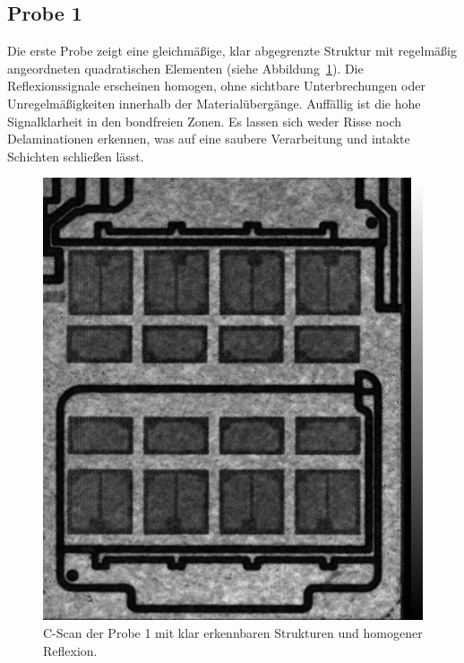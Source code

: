 \subsection{Probe 1}

Die erste Probe zeigt eine gleichmäßige, klar abgegrenzte Struktur mit regelmäßig angeordneten quadratischen Elementen (siehe Abbildung~\ref{Abbildung 6 :probe1}). Die Reflexionssignale erscheinen homogen, ohne sichtbare Unterbrechungen oder Unregelmäßigkeiten innerhalb der Materialübergänge. Auffällig ist die hohe Signalklarheit in den bondfreien Zonen. Es lassen sich weder Risse noch Delaminationen erkennen, was auf eine saubere Verarbeitung und intakte Schichten schließen lässt.
\vspace{0.2cm}
\begin{figure}[htbp]
    \centering
    \includegraphics[scale=0.20]{Bilder/Probe11.jpg}
    \caption{C-Scan der Probe 1 mit klar erkennbaren Strukturen und homogener Reflexion.}
    \label{Abbildung 6 :probe1}
\end{figure}
